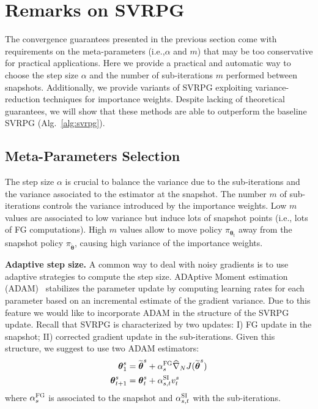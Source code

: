 \documentclass{article}
\makeatletter
\theoremstyle{remark}
\theoremstyle{definition}
\DeclareRobustCommand{\ie}{i.e.,\@\xspace}
\newcommand{\vtheta}{\boldsymbol{\theta}}
\newcommand{\wt}[1]{\widetilde{#1}}
\newcommand{\wh}[1]{\widehat{#1}}
\makeatother
\begin{document}
\section{Remarks on SVRPG}
The convergence guarantees presented in the previous section come with requirements on the meta-parameters (\ie $\alpha$ and $m$) that may be too conservative for practical applications.
Here we provide a practical and automatic way to choose the step size $\alpha$ and the number of sub-iterations $m$ performed between snapshots.
Additionally, we provide variants of SVRPG exploiting variance-reduction techniques for importance weights. Despite lacking of theoretical guarantees, we will show that these methods are able to outperform the baseline SVRPG (Alg.~\ref{alg:svrpg}).

\subsection{Meta-Parameters Selection}\label{sec:stopping}
The step size $\alpha$ is crucial to balance the variance due to the sub-iterations and the variance associated to the estimator at the snapshot.
The number $m$ of sub-iterations controls the variance introduced by the importance weights. Low $m$ values are associated to low variance but induce lots of snapshot points (\ie lots of FG computations). High $m$ values allow to move policy $\pi_{\vtheta_t}$ away from the snapshot policy $\pi_{\wt{\vtheta}}$, causing high variance of the importance weights.

\textbf{Adaptive step size.}
A common way to deal with noisy gradients is to use adaptive strategies to compute the step size.
ADAptive Moment estimation (ADAM)~\citep{kingma2014adam} stabilizes the parameter update by computing learning rates for each parameter based on an incremental estimate of the gradient variance.
Due to this feature we would like to incorporate ADAM in the structure of the SVRPG update.
Recall that SVRPG is characterized by two updates: I) FG update in the snapshot; II) corrected gradient update in the sub-iterations.
Given this structure, we suggest to use two ADAM estimators:
\begin{align*}
        \vtheta^{s}_1 &= \wt{\vtheta}^s + \alpha^{\textsc{FG}}_s\wh{\nabla}_N J(\wt{\vtheta}^s)\\
        \vtheta^{s}_{t+1} &= \vtheta^{s}_t + \alpha^{\textsc{SI}}_{s,t} v_t^{s}
\end{align*}
where $\alpha^{\textsc{FG}}_{s}$ is associated to the snapshot and $\alpha^{\textsc{SI}}_{s,t}$ with the sub-iterations.
\end{document}
